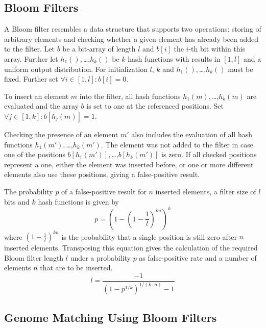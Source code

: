 \documentclass{llncs}
\begin{document}
\subsection{Bloom Filters}
\label{sec:bf}

A Bloom filter resembles a data structure that supports two operations: storing of arbitrary elements and checking whether a given element has already been added to the filter.
Let $b$ be a bit-array of length $l$ and $b[i]$ the $i$-th bit within this array.
Further let $h_1()$,\,\dots,$h_k()$ be $k$ hash functions with results in $[1,l]$ and a uniform output distribution.
For initialization $l$, $k$ and $h_1()$,\,\dots,$h_k()$ must be fixed.
Further set $\forall i \in [1,l]:b[i]=0$.

To insert an element $m$ into the filter, all hash functions
$h_1(m)$,\,\dots,$h_k(m)$ are evaluated and the array $b$ is set to one at the referenced positions.
Set $\forall j \in [1,k]: b[h_j(m)]=1$.

Checking the presence of an element $m'$ also includes the evaluation of all
hash functions $h_1(m')$,\,\dots,$h_k(m')$.
The element was not added to the filter in case one of the positions
$b[h_1(m')]$,\,\dots,$b[h_k(m')]$ is zero.
If all checked positions represent a one, either the element was inserted before, or one or more different elements also use these positions, giving a false-positive result.

The probability $p$ of a false-positive result for $n$ inserted elements, a
filter size of $l$ bits and $k$ hash functions is given by $$
p = \left(1-\left(1-\frac{1}{l}\right)^{kn}\right)^k
$$
where $\left(1-\frac{1}{l}\right)^{kn}$ is the probability that a single position is still zero after $n$ inserted elements.
Transposing this equation gives the calculation of the required Bloom filter length $l$ under a probability $p$ as false-positive rate and a number of elements $n$ that are to be inserted.
\begin{equation}
\label{eq:bloomLen}
 l = \frac{-1}{(1-p^{1/k})^{1/(k \cdot n)}-1} 
\end{equation}

\subsection{Genome Matching Using Bloom Filters}
\label{sec:matching}
\end{document}
